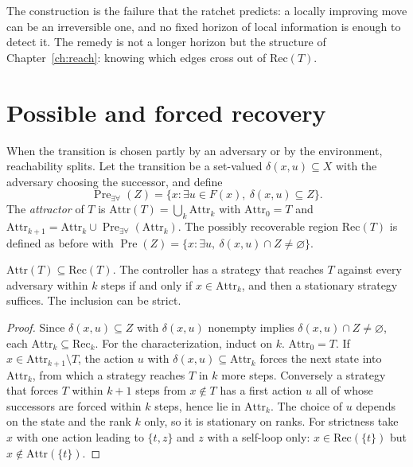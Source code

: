 The construction is the failure that the ratchet predicts: a locally improving move can be an irreversible one, and no fixed horizon of local information is enough to detect it. The remedy is not a longer horizon but the structure of Chapter~\ref{ch:reach}: knowing which edges cross out of $\mathrm{Rec}(T)$.

\section{Possible and forced recovery}

When the transition is chosen partly by an adversary or by the environment, reachability splits. Let the transition be a set-valued $\delta(x,u)\subseteq X$ with the adversary choosing the successor, and define
\[
\operatorname{Pre}_{\exists\forall}(Z)=\{x:\exists u\in F(x),\ \delta(x,u)\subseteq Z\}.
\]
The \emph{attractor} of $T$ is $\mathrm{Attr}(T)=\bigcup_k\mathrm{Attr}_k$ with $\mathrm{Attr}_0=T$ and $\mathrm{Attr}_{k+1}=\mathrm{Attr}_k\cup\operatorname{Pre}_{\exists\forall}(\mathrm{Attr}_k)$. The possibly recoverable region $\mathrm{Rec}(T)$ is defined as before with $\operatorname{Pre}(Z)=\{x:\exists u,\ \delta(x,u)\cap Z\ne\varnothing\}$.

\begin{newresult}\label{thm:attractor}
$\mathrm{Attr}(T)\subseteq\mathrm{Rec}(T)$. The controller has a strategy that reaches $T$ against every adversary within $k$ steps if and only if $x\in\mathrm{Attr}_k$, and then a stationary strategy suffices. The inclusion can be strict.
\end{newresult}
\begin{proof}
Since $\delta(x,u)\subseteq Z$ with $\delta(x,u)$ nonempty implies $\delta(x,u)\cap Z\ne\varnothing$, each $\mathrm{Attr}_k\subseteq\mathrm{Rec}_k$. For the characterization, induct on $k$. $\mathrm{Attr}_0=T$. If $x\in\mathrm{Attr}_{k+1}\setminus T$, the action $u$ with $\delta(x,u)\subseteq\mathrm{Attr}_k$ forces the next state into $\mathrm{Attr}_k$, from which a strategy reaches $T$ in $k$ more steps. Conversely a strategy that forces $T$ within $k+1$ steps from $x\notin T$ has a first action $u$ all of whose successors are forced within $k$ steps, hence lie in $\mathrm{Attr}_k$. The choice of $u$ depends on the state and the rank $k$ only, so it is stationary on ranks. For strictness take $x$ with one action leading to $\{t,z\}$ and $z$ with a self-loop only: $x\in\mathrm{Rec}(\{t\})$ but $x\notin\mathrm{Attr}(\{t\})$.
\end{proof}


